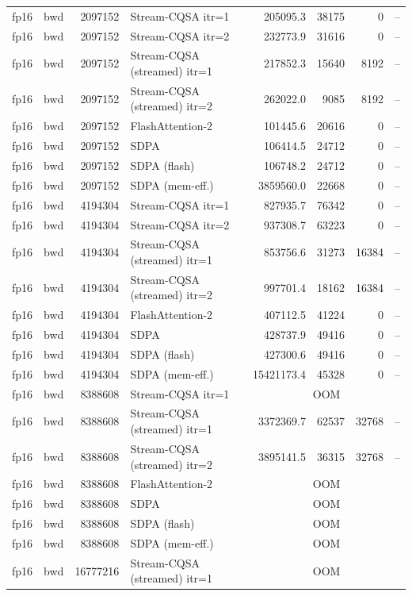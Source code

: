 \begin{tabular}{llrlrrrl}
fp16 & bwd & 2097152 & Stream-CQSA itr=1 & 205095.3 & 38175 & 0 & -- \\
fp16 & bwd & 2097152 & Stream-CQSA itr=2 & 232773.9 & 31616 & 0 & -- \\
fp16 & bwd & 2097152 & Stream-CQSA (streamed) itr=1 & 217852.3 & 15640 & 8192 & -- \\
fp16 & bwd & 2097152 & Stream-CQSA (streamed) itr=2 & 262022.0 & 9085 & 8192 & -- \\
fp16 & bwd & 2097152 & FlashAttention-2 & 101445.6 & 20616 & 0 & -- \\
fp16 & bwd & 2097152 & SDPA & 106414.5 & 24712 & 0 & -- \\
fp16 & bwd & 2097152 & SDPA (flash) & 106748.2 & 24712 & 0 & -- \\
fp16 & bwd & 2097152 & SDPA (mem-eff.) & 3859560.0 & 22668 & 0 & -- \\
fp16 & bwd & 4194304 & Stream-CQSA itr=1 & 827935.7 & 76342 & 0 & -- \\
fp16 & bwd & 4194304 & Stream-CQSA itr=2 & 937308.7 & 63223 & 0 & -- \\
fp16 & bwd & 4194304 & Stream-CQSA (streamed) itr=1 & 853756.6 & 31273 & 16384 & -- \\
fp16 & bwd & 4194304 & Stream-CQSA (streamed) itr=2 & 997701.4 & 18162 & 16384 & -- \\
fp16 & bwd & 4194304 & FlashAttention-2 & 407112.5 & 41224 & 0 & -- \\
fp16 & bwd & 4194304 & SDPA & 428737.9 & 49416 & 0 & -- \\
fp16 & bwd & 4194304 & SDPA (flash) & 427300.6 & 49416 & 0 & -- \\
fp16 & bwd & 4194304 & SDPA (mem-eff.) & 15421173.4 & 45328 & 0 & -- \\
fp16 & bwd & 8388608 & Stream-CQSA itr=1 & \multicolumn{4}{c}{OOM} \\
fp16 & bwd & 8388608 & Stream-CQSA (streamed) itr=1 & 3372369.7 & 62537 & 32768 & -- \\
fp16 & bwd & 8388608 & Stream-CQSA (streamed) itr=2 & 3895141.5 & 36315 & 32768 & -- \\
fp16 & bwd & 8388608 & FlashAttention-2 & \multicolumn{4}{c}{OOM} \\
fp16 & bwd & 8388608 & SDPA & \multicolumn{4}{c}{OOM} \\
fp16 & bwd & 8388608 & SDPA (flash) & \multicolumn{4}{c}{OOM} \\
fp16 & bwd & 8388608 & SDPA (mem-eff.) & \multicolumn{4}{c}{OOM} \\
fp16 & bwd & 16777216 & Stream-CQSA (streamed) itr=1 & \multicolumn{4}{c}{OOM} \\

\end{tabular}

